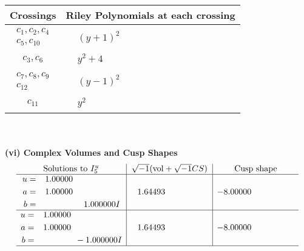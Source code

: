 \documentclass[1p]{elsarticle_modified}
\theoremstyle{definition}
\newcommand{\I}{\sqrt{-1}}
\begin{document}
\begin{tabular}{m{50pt}|m{274pt}}
Crossings & \hspace{64pt}Riley Polynomials at each crossing \\
\hline $$\begin{aligned}c_{1},c_{2},c_{4}\\c_{5},c_{10}\end{aligned}$$&$\begin{aligned}
&(y+1)^2
\end{aligned}$\\
\hline $$\begin{aligned}c_{3},c_{6}\end{aligned}$$&$\begin{aligned}
&y^2+4
\end{aligned}$\\
\hline $$\begin{aligned}c_{7},c_{8},c_{9}\\c_{12}\end{aligned}$$&$\begin{aligned}
&(y-1)^2
\end{aligned}$\\
\hline $$\begin{aligned}c_{11}\end{aligned}$$&$\begin{aligned}
&y^2
\end{aligned}$\\
\hline
\end{tabular}\\~\\
\newpage\flushleft \textbf{(vi) Complex Volumes and Cusp Shapes}
$$\begin{array}{c|c|c}  
\text{Solutions to }I^u_{5}& \I (\text{vol} + \sqrt{-1}CS) & \text{Cusp shape}\\
 \hline 
\begin{aligned}
u &= \phantom{-}1.00000\phantom{ +0.000000I} \\
a &= \phantom{-}1.00000\phantom{ +0.000000I} \\
b &= \phantom{-0.000000 -}1.000000 I\end{aligned}
 & \phantom{-}1.64493\phantom{ +0.000000I} & -8.00000\phantom{ +0.000000I} \\ \hline\begin{aligned}
u &= \phantom{-}1.00000\phantom{ +0.000000I} \\
a &= \phantom{-}1.00000\phantom{ +0.000000I} \\
b &= \phantom{-0.000000 } -1.000000 I\end{aligned}
 & \phantom{-}1.64493\phantom{ +0.000000I} & -8.00000\phantom{ +0.000000I}\\
 \hline 
 \end{array}$$\newpage
\end{document}
